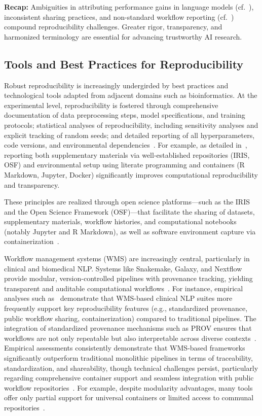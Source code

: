 \documentclass[sigconf]{acmart}
\begin{document}
\begin{flushright}
\textbf{Recap:} Ambiguities in attributing performance gains in language models (cf.~\cite{ref107}), inconsistent sharing practices, and non-standard workflow reporting (cf.~\cite{ref108}) compound reproducibility challenges. Greater rigor, transparency, and harmonized terminology are essential for advancing trustworthy AI research.
\end{flushright}

\subsection{Tools and Best Practices for Reproducibility}

Robust reproducibility is increasingly undergirded by best practices and technological tools adapted from adjacent domains such as bioinformatics. At the experimental level, reproducibility is fostered through comprehensive documentation of data preprocessing steps, model specifications, and training protocols; statistical analyses of reproducibility, including sensitivity analyses and explicit tracking of random seeds; and detailed reporting of all hyperparameters, code versions, and environmental dependencies~\cite{ref108}. For example, as detailed in~\cite{ref108}, reporting both supplementary materials via well-established repositories (IRIS, OSF) and environmental setup using literate programming and containers (R Markdown, Jupyter, Docker) significantly improves computational reproducibility and transparency.

These principles are realized through open science platforms---such as the IRIS and the Open Science Framework (OSF)---that facilitate the sharing of datasets, supplementary materials, workflow histories, and computational notebooks (notably Jupyter and R Markdown), as well as software environment capture via containerization~\cite{ref108}.

Workflow management systems (WMS) are increasingly central, particularly in clinical and biomedical NLP. Systems like Snakemake, Galaxy, and Nextflow provide modular, version-controlled pipelines with provenance tracking, yielding transparent and auditable computational workflows~\cite{ref12,ref13,ref24,ref25,ref28,ref29,ref32,ref33,ref34,ref39,ref44,ref46,ref50,ref58,ref65}. For instance, empirical analyses such as~\cite{ref28} demonstrate that WMS-based clinical NLP suites more frequently support key reproducibility features (e.g., standardized provenance, public workflow sharing, containerization) compared to traditional pipelines. The integration of standardized provenance mechanisms such as PROV ensures that workflows are not only repeatable but also interpretable across diverse contexts~\cite{ref28,ref13}. Empirical assessments consistently demonstrate that WMS-based frameworks significantly outperform traditional monolithic pipelines in terms of traceability, standardization, and shareability, though technical challenges persist, particularly regarding comprehensive container support and seamless integration with public workflow repositories~\cite{ref65}. For example, despite modularity advantages, many tools offer only partial support for universal containers or limited access to communal repositories~\cite{ref28,ref65}.
\end{document}
